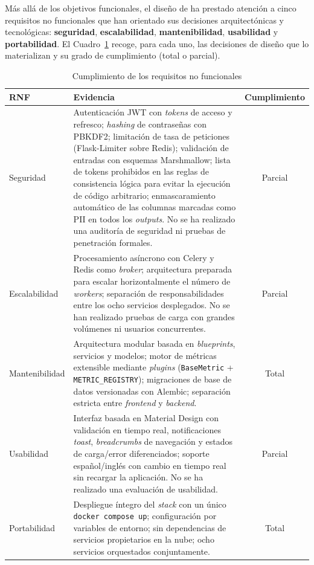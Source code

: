 Más allá de los objetivos funcionales, el diseño de \dataqual ha prestado
atención a cinco requisitos no funcionales que han orientado sus decisiones
arquitectónicas y tecnológicas: \textbf{seguridad}, \textbf{escalabilidad},
\textbf{mantenibilidad}, \textbf{usabilidad} y \textbf{portabilidad}.  El
Cuadro~\ref{tab:rnf-cumplimiento} recoge, para cada uno, las decisiones de
diseño que lo materializan y su grado de cumplimiento (total o parcial).

\begin{table}[htbp]
  \centering
  \caption{Cumplimiento de los requisitos no funcionales}
  \label{tab:rnf-cumplimiento}
  \footnotesize
  \renewcommand{\arraystretch}{1.4}%
  \begin{tabularx}{\textwidth}{l X c}
    \toprule
    \textbf{RNF} & \textbf{Evidencia} & \textbf{Cumplimiento} \\
    \midrule
    Seguridad & Autenticación \ac{JWT} con \emph{tokens} de acceso y
      refresco; \emph{hashing} de contraseñas con \ac{PBKDF2}; limitación
      de tasa de peticiones (Flask-Limiter sobre Redis); validación de
      entradas con esquemas Marshmallow; lista de tokens prohibidos en
      las reglas de consistencia lógica para evitar la ejecución de
      código arbitrario; enmascaramiento automático de las columnas
      marcadas como \ac{PII} en todos los \emph{outputs}.  No se ha
      realizado una auditoría de seguridad ni pruebas de penetración
      formales. & Parcial \\
    Escalabilidad & Procesamiento asíncrono con Celery y Redis como
      \emph{broker}; arquitectura preparada para escalar
      horizontalmente el número de \emph{workers}; separación de
      responsabilidades entre los ocho servicios desplegados.  No se han
      realizado pruebas de carga con grandes volúmenes ni usuarios
      concurrentes. & Parcial \\
    Mantenibilidad & Arquitectura modular basada en \emph{blueprints},
      servicios y modelos; motor de métricas extensible mediante
      \emph{plugins} (\texttt{BaseMetric} + \texttt{METRIC\_REGISTRY});
      migraciones de base de datos versionadas con Alembic; separación
      estricta entre \emph{frontend} y \emph{backend}. & Total \\
    Usabilidad & Interfaz basada en Material Design con validación en
      tiempo real, notificaciones \emph{toast}, \emph{breadcrumbs} de
      navegación y estados de carga/error diferenciados; soporte
      español/inglés con cambio en tiempo real sin recargar la
      aplicación.  No se ha realizado una evaluación de usabilidad. & Parcial \\
    Portabilidad & Despliegue íntegro del \emph{stack} con un único
      \texttt{docker\,compose\,up}; configuración por variables de
      entorno; sin dependencias de servicios propietarios en la nube;
      ocho servicios orquestados conjuntamente. & Total \\
    \bottomrule
  \end{tabularx}
\end{table}

